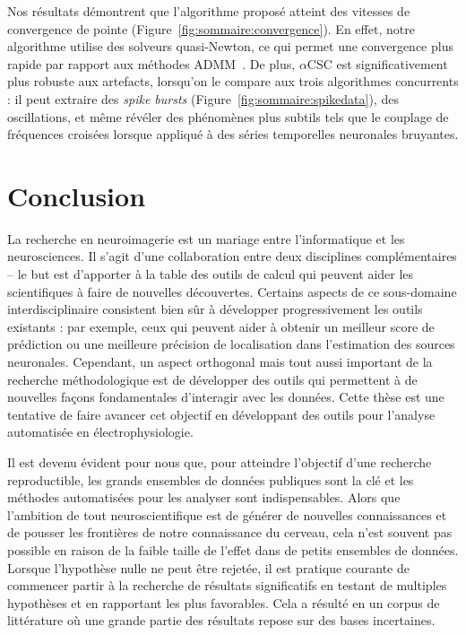 Nos résultats démontrent que l'algorithme proposé atteint des vitesses de convergence de pointe (Figure~\ref{fig:sommaire:convergence}). En effet, notre algorithme utilise des solveurs quasi-Newton, ce qui permet une convergence plus rapide par rapport aux méthodes ADMM~\citep{heide2015fast, wohlberg2016efficient}. De plus,  $\alpha$CSC est significativement plus robuste aux artefacts, lorsqu’on le compare aux trois algorithmes concurrents : il peut extraire des \emph{spike bursts} (Figure~\ref{fig:sommaire:spikedata}), des oscillations, et même révéler des phénomènes plus subtils tels que le couplage de fréquences croisées lorsque appliqué à des séries temporelles neuronales bruyantes.

\section*{Conclusion}

La recherche en neuroimagerie est un mariage entre l'informatique et les neurosciences. Il s'agit d'une collaboration entre deux disciplines complémentaires -- le but est d'apporter à la table des outils de calcul qui peuvent aider les scientifiques à faire de nouvelles découvertes. Certains aspects de ce sous-domaine interdisciplinaire consistent bien sûr à développer progressivement les outils existants : par exemple, ceux qui peuvent aider à obtenir un meilleur score de prédiction ou une meilleure précision de localisation dans l'estimation des sources neuronales. Cependant, un aspect orthogonal mais tout aussi important de la recherche méthodologique est de développer des outils qui permettent à de nouvelles façons fondamentales d'interagir avec les données. Cette thèse est une tentative de faire avancer cet objectif en développant des outils pour l'analyse automatisée en électrophysiologie.

Il est devenu évident pour nous que, pour atteindre l'objectif d'une recherche reproductible, les grands ensembles de données publiques sont la clé et les méthodes automatisées pour les analyser sont indispensables. Alors que l'ambition de tout neuroscientifique est de générer de nouvelles connaissances et de pousser les frontières de notre connaissance du cerveau, cela n'est souvent pas possible en raison de la faible taille de l'effet dans de petits ensembles de données. Lorsque l'hypothèse nulle ne peut être rejetée, il est pratique courante de commencer partir à la recherche  de résultats significatifs en testant de multiples hypothèses et en rapportant les plus favorables. Cela a résulté en un corpus de littérature où une grande partie des résultats repose sur des bases incertaines.
 

